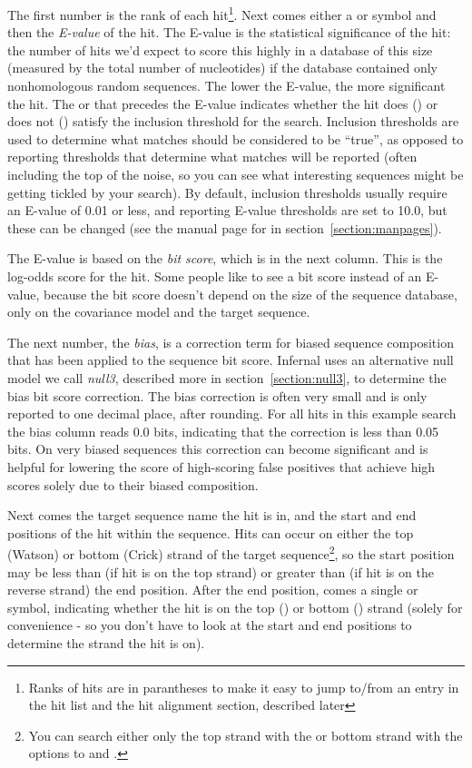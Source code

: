 The first number is the rank of each hit\footnote{Ranks of hits are in
  parantheses to make it easy to jump to/from an entry in the hit list
  and the hit alignment section, described later}. Next comes either a
\otext{!} or  symbol and then the \emph{E-value} of the hit.
The E-value is the statistical significance of the hit: the number of
hits we'd expect to score this highly in a database of this size
(measured by the total number of nucleotides) if the database
contained only nonhomologous random sequences. The lower the E-value,
the more significant the hit. The \otext{!} or  that
precedes the E-value indicates whether the hit does (\otext{!}) or
does not () satisfy the inclusion threshold for the search.
Inclusion thresholds are used to determine what matches should be
considered to be ``true'', as opposed to reporting thresholds that
determine what matches will be reported (often including the top of
the noise, so you can see what interesting sequences might be getting
tickled by your search). By default, inclusion thresholds usually
require an E-value of 0.01 or less, and reporting E-value thresholds
are set to 10.0, but these can be changed (see the manual page for
 in section~\ref{section:manpages}).

The E-value is based on the \emph{bit score}, which is in the next
column. This is the log-odds score for the hit. Some people like to
see a bit score instead of an E-value, because the bit score doesn't
depend on the size of the sequence database, only on the covariance
model and the target sequence.

The next number, the \emph{bias}, is a correction term for biased
sequence composition that has been applied to the sequence bit
score. Infernal uses an alternative null model we call \emph{null3},
described more in section~\ref{section:null3}, to determine the bias
bit score correction. The bias correction is often very small and is
only reported to one decimal place, after rounding. For all hits in
this example search the bias column reads 0.0 bits, indicating that
the correction is less than 0.05 bits. On very biased sequences this
correction can become significant and is helpful for lowering the
score of high-scoring false positives that achieve high scores solely
due to their biased composition. 

Next comes the target sequence name the hit is in, and the start and
end positions of the hit within the sequence. Hits can occur on either
the top (Watson) or bottom (Crick) strand of the target
sequence\footnote{You can search either only the top strand with the
 or bottom strand with the  options
to  and .}, so the start position may be
less than (if hit is on the top strand) or greater than (if hit is on
the reverse strand) the end position. After the end position, comes a single
\otext{+} or \otext{-} symbol, indicating whether the hit is on the
top (\otext{+}) or bottom (\otext{-}) strand (solely for convenience -
so you don't have to look at the start and end positions to determine
the strand the hit is on).


